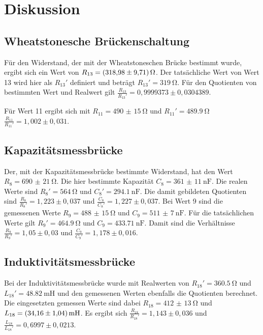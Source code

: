 \section{Diskussion}
    \subsection{Wheatstonesche Brückenschaltung}
    Für den Widerstand, der mit der Wheatstoneschen Brücke bestimmt wurde, ergibt sich ein Wert von $R_{13}=\qty{318,98(9,71)}{\ohm}$.
    Der tatsächliche Wert von Wert 13 wird hier als $R_{13}'$ definiert und beträgt $R_{13}'=\qty{319}{\ohm}$.
    Für den Quotienten von bestimmten Wert und Realwert gilt $\frac{R_{13}}{R_{13}'}=0,9999373\pm0,0304389$.

    Für Wert 11 ergibt sich mit $R_{11}=\qty{490(15)}{\ohm}$ und $R_{11}'=\qty{489,9}{\ohm}$ $\frac{R_{11}}{R_11'}=1,002\pm0,031$.

    \subsection{Kapazitätsmessbrücke}
    Der, mit der Kapazitätsmessbrücke bestimmte Widerstand, hat den Wert $R_8=\qty{690(21)}{\ohm}$.
    Die hier bestimmte Kapazität $C_8=\qty{361(11)}{\nano\farad}$. 
    Die realen Werte sind $R_8'=\qty{564}{\ohm}$ und $C_8'=\qty{294,1}{\nano\farad}$.
    Die damit gebildeten Quotienten sind $\frac{R_8}{R_8'}=1,223\pm0,037$ und $\frac{C_8}{C_8'}=1,227\pm0,037$.
    Bei Wert 9 sind die gemessenen Werte $R_9=\qty{488(15)}{\ohm}$ und $C_9=\qty{511(7)}{\nano\farad}$.
    Für die tatsächlichen Werte gilt $R_9'=\qty{464,9}{\ohm}$ und $C_9=\qty{433,71}{\nano\farad}$.
    Damit sind die Verhältnisse $\frac{R_9}{R_9'}=1,05\pm0,03$ und $\frac{C_9}{C_9'}=1,178\pm0,016$.
    
    \subsection{Induktivitätsmessbrücke}
    Bei der Induktivitätsmessbrücke wurde mit Realwerten von $R_{18}'=\qty{360,5}{\ohm}$ und $L_{18}'=\qty{48,82}{\milli\henry}$ und den gemessenen Werten ebenfalls die Quotienten berechnet.
    Die eingesetzten gemessen Werte sind dabei $R_{18}=\qty{412(13)}{\ohm}$ und $L_{18}=\qty{34,16(1,04)}{\milli\henry}$.
    Es ergibt sich $\frac{R_{18}}{R_{18}'}=1,143\pm0,036$ und $\frac{L_{18}}{L_{18}'}=0,6997\pm0,0213$.

\label{sec:Diskussion}
